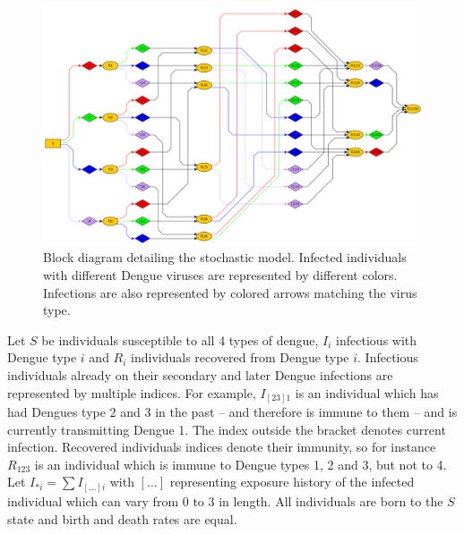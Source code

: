 \documentclass[12pt]{article}
\begin{document}
          \begin{figure}
 \centering
 \includegraphics[width=16cm]{plots/Dengue4.png}

 \caption{Block diagram detailing the stochastic model. Infected individuals 
with different Dengue viruses are represented by different colors. Infections 
are also represented by colored arrows matching the virus type.}
 \label{fig:sde_blocks}
\end{figure}


Let $S$ be individuals susceptible to all 4 types of dengue, $I_i$ infectious 
with Dengue type $i$ and $R_i$ individuals recovered from Dengue type $i$. 
Infectious individuals already on their secondary and later Dengue infections 
are represented by multiple indices. For example, $I_{[23]1}$ is an individual 
which has had Dengues type 2 and 3 in the past -- and therefore is immune to 
them -- and is currently transmitting Dengue 1. 
The index outside the bracket 
denotes current infection. Recovered individuals indices denote their immunity, 
so for instance $R_{123}$ is an individual which is immune to Dengue types 1, 2 
and 3, but not to 4. Let $I_{*i} = \sum I_{[\ldots]i}$ with $[\ldots]$ 
representing exposure history of the infected individual which can vary from 0 
to 3 in length. 
All individuals are born to the $S$ state and birth and death 
rates are equal.
\end{document}
